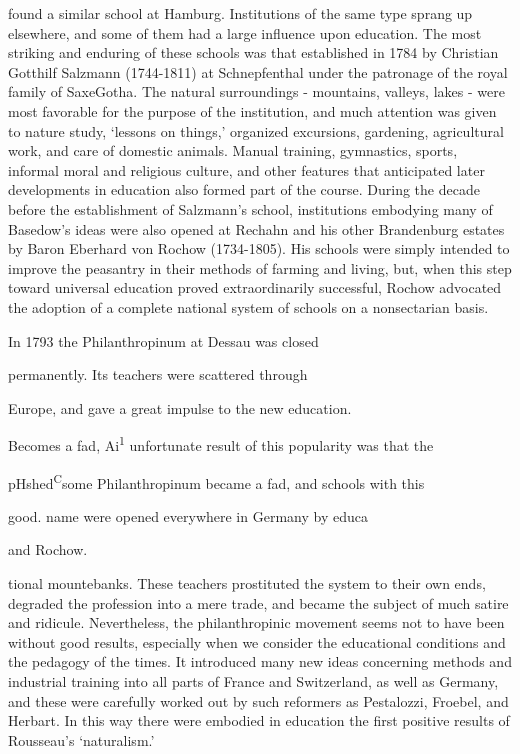 \documentclass[]{book}
\begin{document}
found a similar school at Hamburg. Institutions of the same type sprang up elsewhere, and some of them had a large influence upon education. The most striking and enduring of these schools was that established in 1784 by Christian Gotthilf Salzmann (1744-1811) at Schnepfenthal under the patronage of the royal family of SaxeGotha. The natural surroundings - mountains, valleys, lakes - were most favorable for the purpose of the institution, and much attention was given to nature study, `lessons on things,' organized excursions, gardening, agricultural work, and care of domestic animals. Manual training, gymnastics, sports, informal moral and religious culture, and other features that anticipated later developments in education also formed part of the course. During the decade before the establishment of Salzmann's school, institutions embodying many of Basedow's ideas were also opened at Rechahn and his other Brandenburg estates by Baron Eberhard von Rochow (1734-1805). His schools were simply intended to improve the peasantry in their methods of farming and living, but, when this step toward universal education proved extraordinarily successful, Rochow advocated the adoption of a complete national system of schools on a nonsectarian basis.

In 1793 the Philanthropinum at Dessau was closed

permanently. Its teachers were scattered through

Europe, and gave a great impulse to the new education.

Becomes a fad, Ai\textsuperscript{1} unfortunate result of this popularity was that the

pHshed\textsuperscript{C}some Philanthropinum became a fad, and schools with this

good. name were opened everywhere in Germany by educa

and Rochow.

tional mountebanks. These teachers prostituted the system to their own ends, degraded the profession into a mere trade, and became the subject of much satire and ridicule. Nevertheless, the philanthropinic movement seems not to have been without good results, especially when we consider the educational conditions and the pedagogy of the times. It introduced many new ideas concerning methods and industrial training into all parts of France and Switzerland, as well as Germany, and these were carefully worked out by such reformers as Pestalozzi, Froebel, and Herbart. In this way there were embodied in education the first positive results of Rousseau's `naturalism.'
\end{document}
